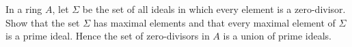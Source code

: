 \begin{exercise}
In a ring \(A\), let \(\Sigma\) be the set of all ideals in which every element is a zero-divisor.
Show that the set \(\Sigma\) has maximal elements and that every maximal element of \(\Sigma\) is a prime ideal.
Hence the set of zero-divisors in \(A\) is a union of prime ideals.
\end{exercise}

\begin{solution}

\end{solution}